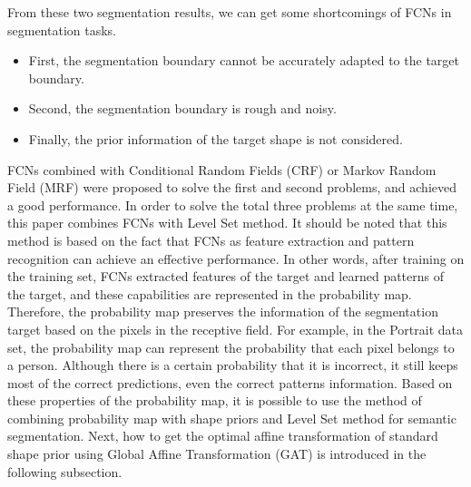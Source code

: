 From these two segmentation results, we can get some shortcomings of FCNs in segmentation tasks.
\begin{itemize}\label{itemize: FCN shortcomings}
  \item First, the segmentation boundary cannot be accurately adapted to the target boundary.
  \item Second, the segmentation boundary is rough and noisy.
  \item Finally, the prior information of the target shape is not considered.
\end{itemize}
FCNs combined with Conditional Random Fields (CRF) \cite{FCN:CRF:zheng2015conditional} or Markov Random Field (MRF) \cite{FCN:MRF:liu2015semantic} were proposed to solve the first and second problems, and achieved a good performance. In order to solve the total three problems at the same time, this paper combines FCNs with Level Set method. It should be noted that this method is based on the fact that FCNs as feature extraction and pattern recognition can achieve an effective performance. In other words, after training on the training set, FCNs extracted features of the target and learned patterns of the target, and these capabilities are represented in the probability map. Therefore, the probability map preserves the information of the segmentation target based on the pixels in the receptive field. For example, in the Portrait data set, the probability map can represent the probability that each pixel belongs to a person. Although there is a certain probability that it is incorrect, it still keeps most of the correct predictions, even the correct patterns information. Based on these properties of the probability map, it is possible to use the method of combining probability map with shape priors and Level Set method for semantic segmentation. Next, how to get the optimal affine transformation of standard shape prior using Global Affine Transformation (GAT) is introduced in the following subsection.


